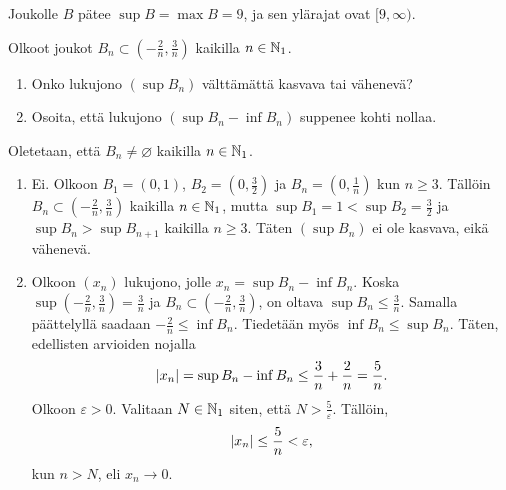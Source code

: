 \documentclass[11pt,a4paper]{amsart}
\begin{document}
\begin{solution}
\begin{enumerate}[label=\alph*), nosep]
  Joukolle \(B\) pätee \(\sup B=\max B=9\), ja sen ylärajat ovat \([9,\infty)\).
  \begin{center}
  \end{center}
\end{enumerate}
\end{solution}

\begin{exercise}
Olkoot joukot \(B_n \subset (-\frac{2}{n}, \frac{3}{n})\) kaikilla
\(n \in \mathbb{N}_1\).
\begin{enumerate}[label=\alph*), nosep]
\item Onko lukujono \((\sup B_n)\) välttämättä kasvava tai vähenevä?
\item Osoita, että lukujono \((\sup B_n - \inf B_n)\) suppenee kohti nollaa.
\end{enumerate}
\end{exercise}

\begin{solution}
Oletetaan, että \(B_n \neq \varnothing\) kaikilla \(n \in \mathbb{N}_1\).
\begin{enumerate}[label=\alph*), nosep]
\item Ei. Olkoon \(B_1 = (0, 1)\), \(B_2 = \left(0, \frac{3}{2}\right)\) ja
\(B_n = \left(0, \frac{1}{n}\right)\) kun \(n \geq 3\). Tällöin
\(B_n \subset \left(-\frac{2}{n}, \frac{3}{n}\right)\) kaikilla \(n
\in \mathbb{N}_1\), mutta \(\sup{B_1} = 1 < \sup{B_2} = \frac{3}{2}\) ja
\(\sup{B_n} > \sup{B_{n + 1}}\) kaikilla \(n \geq 3\). Täten
\((\sup{B_n})\) ei ole kasvava, eikä vähenevä.
\item Olkoon \((x_n)\) lukujono, jolle \(x_n = \sup{B_n} - \inf{B_n}\). Koska
\(\sup{\left(-\frac{2}{n}, \frac{3}{n}\right)} = \frac{3}{n}\) ja
\(B_n \subset \left(-\frac{2}{n}, \frac{3}{n}\right)\), on oltava
\(\sup{B_n} \leq \frac{3}{n}\). Samalla päättelyllä saadaan
\(-\frac{2}{n} \leq \inf{B_n}\). Tiedetään myös \(\inf{B_n} \leq \sup{B_n}\).
Täten, edellisten arvioiden nojalla
\[
\lvert x_n\rvert = \sup{B_n} - \inf{B_n} \leq \frac{3}{n} + \frac{2}{n} = \frac{5}{n}.
\]
Olkoon \(\varepsilon > 0\). Valitaan \(N \in \mathbb{N}_1\) siten, että
\(N > \frac{5}{\varepsilon}\). Tällöin,
\[
\lvert x_n\rvert \leq \frac{5}{n} < \varepsilon,
\]
kun \(n > N\), eli \(x_n \to 0\).
\end{enumerate}
\end{solution}
\end{document}
